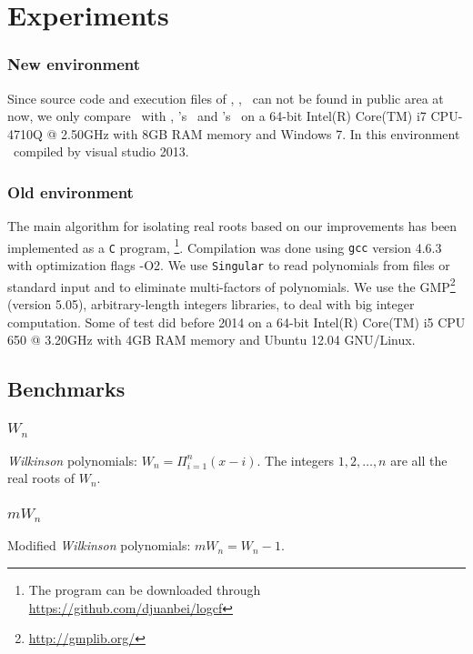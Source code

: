 
\section{Experiments }
\subsubsection{New environment}

{\color{red}Since   source code and execution files  
	of    \eign, \cf,  \sle\  can not be found in public area at now, we only compare \froot\ with \AND, \MM's \inte\  and  \MAPLE's \REALROOT\  on   a 64-bit Intel(R) Core(TM) i7 CPU-4710Q @ 2.50GHz with 8GB RAM memory and Windows 7. In this environment \froot\ compiled by visual studio 2013}.

\subsubsection{Old environment}
The main algorithm for isolating real roots based on our improvements has been implemented as a \texttt{C} program, \froot \footnote{The program can be downloaded through \url{https://github.com/djuanbei/logcf}}. Compilation was done using {\tt gcc} version 4.6.3 with optimization flags -O2.
We use {\tt Singular} \cite{singular} to read polynomials from files or standard input and to eliminate multi-factors of polynomials. We use the GMP\footnote{ \url{http://gmplib.org/}}
(version 5.05), arbitrary-length integers libraries, to deal with big integer computation.
Some of test did before 2014   on a 64-bit Intel(R) Core(TM) i5 CPU 650 @ 3.20GHz with 4GB RAM memory and Ubuntu 12.04 GNU/Linux.



\subsection{Benchmarks }
 \subsubsection{$W_n$}
 {\it Wilkinson} polynomials: $W_n=\Pi_{i=1}^n(x-i)$. The integers $1,2,\ldots,n $ are  all the real roots of $W_n$.
  \subsubsection{$mW_n$}
  Modified {\it Wilkinson} polynomials: $mW_n=W_n-1$.

